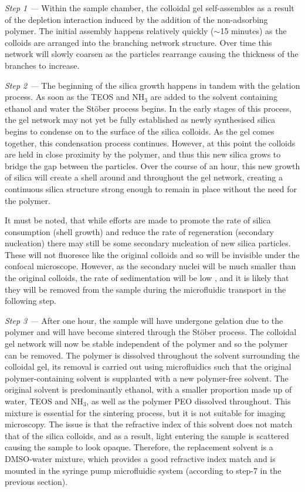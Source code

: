  \textit{Step 1 ---} Within the sample chamber, the colloidal gel self-assembles as a result of the depletion interaction induced by the addition of the non-adsorbing polymer. The initial assembly happens relatively quickly ($\sim$15 minutes) as the colloids are arranged into the branching network structure. Over time this network will slowly coarsen as the particles rearrange causing the thickness of the branches to increase. 
 
\textit{Step 2 ---} The beginning of the silica growth happens in tandem with the gelation process. As soon as the TEOS and NH$_3$ are added to the solvent containing ethanol and water the Stöber process begins. In the early stages of this process, the gel network may not yet be fully established as newly synthesised silica begins to condense on to the surface of the silica colloids. As the gel comes together, this condensation process continues. However, at this point the colloids are held in close proximity by the polymer, and thus this new silica grows to bridge the gap between the particles. Over the course of an hour, this new growth of silica will create a shell around and throughout the gel network, creating a continuous silica structure strong enough to remain in place without the need for the polymer. 
	
	It must be noted, that while efforts are made to promote the rate of silica consumption (shell growth) and reduce the rate of regeneration (secondary nucleation) there may still be some secondary nucleation of new silica particles. These will not fluoresce like the original colloids and so will be invisible under the confocal microscope. However, as the secondary nuclei will be much smaller than the original colloids, the rate of sedimentation will be low \cite{royall2007}, and it is likely that they will be removed from the sample during the microfluidic transport in the following step.
	
\textit{Step 3 ---} After one hour, the sample will have undergone gelation due to the polymer and will have become sintered through the Stöber process. The colloidal gel network will now be stable independent of the polymer and so the polymer can be removed. The polymer is dissolved throughout the solvent surrounding the colloidal gel, its removal is carried out using microfluidics such that the original polymer-containing solvent is supplanted with a new polymer-free solvent. The original solvent is predominantly ethanol, with a smaller proportion made up of water, TEOS and NH$_3$, as well as the polymer PEO dissolved throughout.  This mixture is essential for the sintering process, but it is not suitable for imaging microscopy. The issue is that the refractive index of this solvent does not match that of the silica colloids, and as a result, light entering the sample is scattered causing the sample to look opaque. Therefore, the replacement solvent is a DMSO-water mixture, which provides a good refractive index match and is mounted in the syringe pump microfluidic system (according to step-7 in the previous section).

